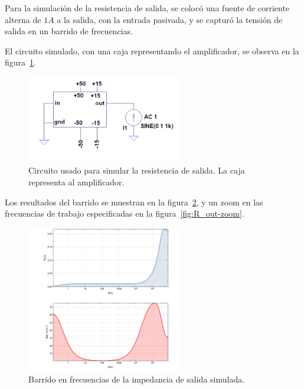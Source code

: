 \documentclass[a4paper,12pt,twoside]{article}
\begin{document}
Para la simulación de la resistencia de salida, se colocó una fuente de corriente alterna de $1A$ a la salida, con la entrada pasivada, y se capturó la tensión de salida en un barrido de frecuencias.


El circuito simulado, con una caja representando el amplificador, se observa en la figura~\ref{fig:circuito_r-out-current}.


\begin{figure}[H]
	\centering
	\includegraphics[width=0.6\textwidth]{img/sim/circuito-r_out-current}
	\caption{Circuito usado para simular la resistencia de salida. La caja representa al amplificador.}
	\label{fig:circuito_r-out-current}
\end{figure}

Los resultados del barrido se muestran en la figura~\ref{fig:R_out}, y un zoom en las frecuencias de trabajo especificadas en la figura~\ref{fig:R_out-zoom}.

\begin{figure}[H]
	\centering
	\includegraphics[width=0.6\textwidth]{img/sim/R_out}
	\caption{Barrido en frecuencias de la impedancia de salida simulada.}
	\label{fig:R_out}
\end{figure}
\end{document}
